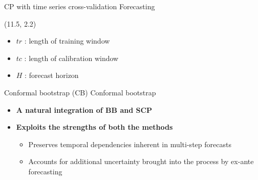 \documentclass[
  12pt,
  ignorenonframetext,
  aspectratio=169,
]{beamer}
\begin{document}
\begin{frame}{CP with time series cross-validation Forecasting}
\label{cp-with-time-series-cross-validation-forecasting-1}

\begin{textblock}{4}(11.5, 2.2)
\fontsize{11}{12}\sf
\begin{block}{}
  \begin{itemize}
  \item \color{violet} {$tr$} : \color{black} length of training window \newline
  \item \color{violet} {$tc$} : \color{black} length of calibration window \newline
  \item \color{violet} {$H$} : \color{black} forecast horizon \newline
\end{itemize}
\end{block}
\end{textblock}
\end{frame}

\begin{frame}{Conformal bootstrap (CB)}
\label{conformal-bootstrap-cb}
\alert{Conformal bootstrap}

\begin{itemize}
  \item \textbf{A natural integration of BB and SCP} \newline
  \pause
  \item \textbf{Exploits the strengths of both the methods} \newline
  \begin{itemize}
  \item \color{violet} Preserves temporal dependencies inherent in multi-step forecasts \newline
  \item \color{violet} Accounts for additional uncertainty brought into the process by ex-ante forecasting
\end{itemize}
\end{itemize}
\end{frame}
\end{document}
